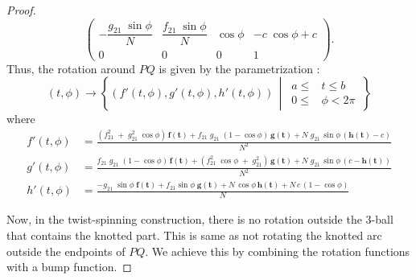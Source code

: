\documentclass[10pt,a4paper,reqno]{amsart}
\theoremstyle{definition}
\theoremstyle{remark}
\newcommand{\LP}{\left(}
\newcommand{\RP}{\right)}
\newcommand{\LC}{\left\{}
\newcommand{\RC}{\right\}}
\begin{document}
\begin{proof}
\[\begin{pmatrix}
		-\dfrac{g_{21}\;\sin\phi}{N} & \dfrac{f_{21}\;\sin\phi}{N}&\cos\phi& -c\;\cos\phi+c \\[0.5cm]
		0 &0 &0 & 1 
	\end{pmatrix}.\]
	Thus, the rotation around $PQ$ is given by the  parametrization :
	\begin{equation}
		(t,\phi) \longrightarrow  \LC \LP f'(t,\phi),g'(t,\phi),h'(t,\phi) \RP\,\middle|\,
		\begin{aligned}
			a \leq &t \leq b \\
			0 \leq &\phi < 2\pi
		\end{aligned}\, \RC 
	\end{equation}
	where
	{\small \begin{align}
			f'(t,\phi)&=\frac{\LP f_{21}^{2}\;+\;g_{21}^{2}\;\cos\phi \RP\,\mathbf{f(t)}+f_{21}\;g_{21}\;(1-\cos\phi)\,\mathbf{g(t)}+N\;g_{21}\,\sin\phi\,(\mathbf{h(t)}-c)}{N^2}\\
			g'(t,\phi)&=\frac{f_{21}\;g_{21}\;(1-\cos\phi)\,\mathbf{f(t)}+\LP f_{21}^{2}\;\cos\phi\;+\;g_{21}^{2} \RP\,\mathbf{g(t)}+N\;g_{21}\,\sin\phi\,(c-\mathbf{h(t)})}{N^{2}}\\
			h'(t,\phi)&=\frac{-g_{21}\;\sin\phi\;\mathbf{f(t)}+f_{21}\sin\phi\;\mathbf{g(t)}+N
				\,\cos\phi\,\mathbf{h(t)}+N\,c\,(1-\cos\phi)}{N}
	\end{align} }
	
	Now, in the twist-spinning construction, there is no rotation outside the $3$-ball that contains the knotted part. This is same as not rotating the knotted arc outside the endpoints of $PQ$. We achieve this by combining the rotation functions with a bump function.


\end{proof}
\end{document}
